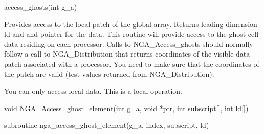 \documentclass[12pt]{article}
\begin{document}
\begin{pyapi}
\begin{pycode}
access_ghosts(int g_a)
\end{pycode}
\begin{funcargs}
\end{funcargs}
\end{pyapi}
\local

\begin{desc}

  Provides access to the local patch of the global array. Returns
  leading dimension ld and and pointer for the data.  This routine
  will provide access to the ghost cell data residing on each
  processor. Calls to NGA_Access_ghosts should normally follow a call
  to NGA_Distribution that returns coordinates of the visible data
  patch associated with a processor. You need to make sure that the
  coordinates of the patch are valid (test values returned from
  NGA_Distribution).

You can only access local data.
This is a local operation.

\end{desc}


\begin{capi}
\begin{ccode}
void NGA_Access_ghost_element(int g_a, void *ptr, int subscript[],
                              int ld[])
\end{ccode}
\begin{funcargs}
\end{funcargs}
\end{capi}

\begin{fapi}
\begin{fcode}
subroutine nga_access_ghost_element(g_a, index, subscript, ld)
\end{fcode}
\begin{funcargs}
\end{funcargs}
\end{fapi}
\end{document}
